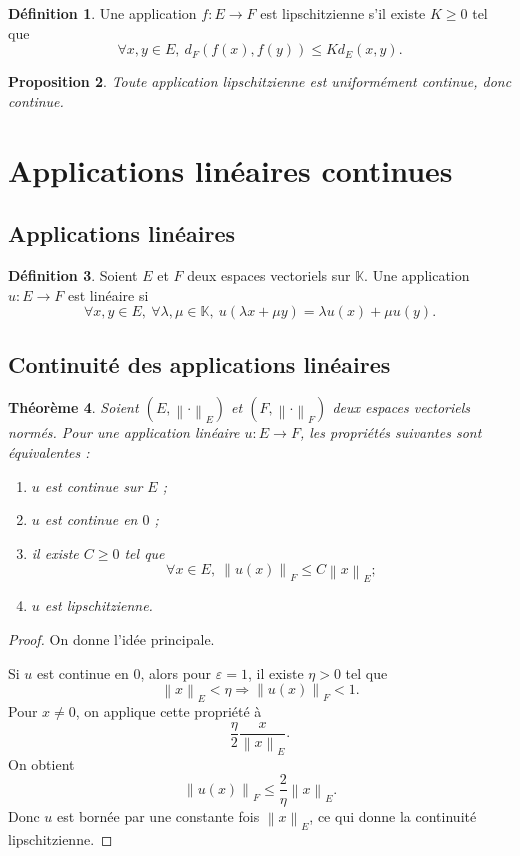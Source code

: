 \documentclass[11pt,a4paper]{article}
\theoremstyle{definition}
\newtheorem{definition}{Définition}[section]
\theoremstyle{plain}
\newtheorem{proposition}[definition]{Proposition}
\newtheorem{theoreme}[definition]{Théorème}
\newcommand{\K}{\mathbb{K}}
\newcommand{\eps}{\varepsilon}
\newcommand{\norme}[1]{\left\lVert #1 \right\rVert}
\begin{document}
\begin{definition}
Une application $f:E\to F$ est lipschitzienne s'il existe $K\geq 0$ tel que
\[
\forall x,y\in E,\ d_F(f(x),f(y))\leq Kd_E(x,y).
\]
\end{definition}

\begin{proposition}
Toute application lipschitzienne est uniformément continue, donc continue.
\end{proposition}

\section{Applications linéaires continues}

\subsection{Applications linéaires}

\begin{definition}
Soient $E$ et $F$ deux espaces vectoriels sur $\K$.
Une application $u:E\to F$ est linéaire si
\[
\forall x,y\in E,\ \forall \lambda,\mu\in\K,\ 
u(\lambda x+\mu y)=\lambda u(x)+\mu u(y).
\]
\end{definition}

\subsection{Continuité des applications linéaires}

\begin{theoreme}
Soient $(E,\norme{\cdot}_E)$ et $(F,\norme{\cdot}_F)$ deux espaces vectoriels normés.
Pour une application linéaire $u:E\to F$, les propriétés suivantes sont équivalentes :
\begin{enumerate}
    \item $u$ est continue sur $E$ ;
    \item $u$ est continue en $0$ ;
    \item il existe $C\geq 0$ tel que
    \[
    \forall x\in E,\ \norme{u(x)}_F\leq C\norme{x}_E ;
    \]
    \item $u$ est lipschitzienne.
\end{enumerate}
\end{theoreme}

\begin{proof}
On donne l'idée principale.

Si $u$ est continue en $0$, alors pour $\eps=1$, il existe $\eta>0$ tel que
\[
\norme{x}_E<\eta \Rightarrow \norme{u(x)}_F<1.
\]
Pour $x\neq 0$, on applique cette propriété à
\[
\frac{\eta}{2}\frac{x}{\norme{x}_E}.
\]
On obtient
\[
\norme{u(x)}_F
\leq
\frac{2}{\eta}\norme{x}_E.
\]
Donc $u$ est bornée par une constante fois $\norme{x}_E$, ce qui donne la continuité lipschitzienne.
\end{proof}
\end{document}
